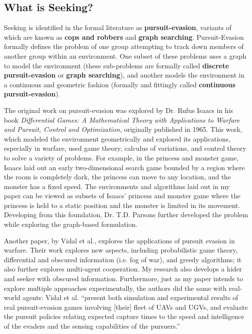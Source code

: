 \documentclass[12pt]{article}
\begin{document}
\subsection{What is Seeking?}
Seeking is identified in the formal literature as \textbf{pursuit-evasion}, variants of which are known as \textbf{cops and robbers} and \textbf{graph searching}. Pursuit-Evasion formally defines the problem of one group attempting to track down members of another group within an environment. One subset of these problems uses a graph to model the environment (these sub-problems are formally called \textbf{discrete pursuit-evasion} or \textbf{graph searching}), and another models the environment in a continuous and geometric fashion (formally and fittingly called \textbf{continuous pursuit-evasion}). 

The original work on pursuit-evasion was explored by Dr. Rufus Isaacs in his book \textit{Differential Games: A Mathematical Theory with Applications to Warfare and Pursuit, Control and Optimization}\cite{Rufus}, originally published in 1965. This work, which modeled the environment geometrically and explored its applications, especially in warfare, used game theory, calculus of variations, and control theory to solve a variety of problems. For example, in the princess and monster game, Isaacs laid out an early two-dimensional search game bounded by a region where the room is completely dark, the princess can move to any location, and the monster has a fixed speed. The environments and algorithms laid out in my paper can be viewed as subsets of Isaacs' princess and monster game where the princess is held to a static position and the monster is limited in its movement. Developing from this foundation, Dr. T.D. Parsons further developed the problem while exploring the graph-based formulation\cite{Parsons}.

Another paper, by Vidal et al., explores the applications of pursuit evasion in warfare\cite{Vidal}. Their work explores new aspects, including probabilistic game theory, differential and obscured information (i.e. fog of war), and greedy algorithms; it also further explores multi-agent cooperation. My research also develops a hider and seeker with obscured information. Furthermore, just as my paper intends to explore multiple approaches experimentally, the authors did the same with real-world agents: Vidal et al. ``present both simulation and experimental results of real pursuit-evasion games involving [their] fleet of UAVs and UGVs, and evaluate the pursuit policies relating expected capture times to the speed and intelligence of the evaders and the sensing capabilities of the pursuers.''
\end{document}
